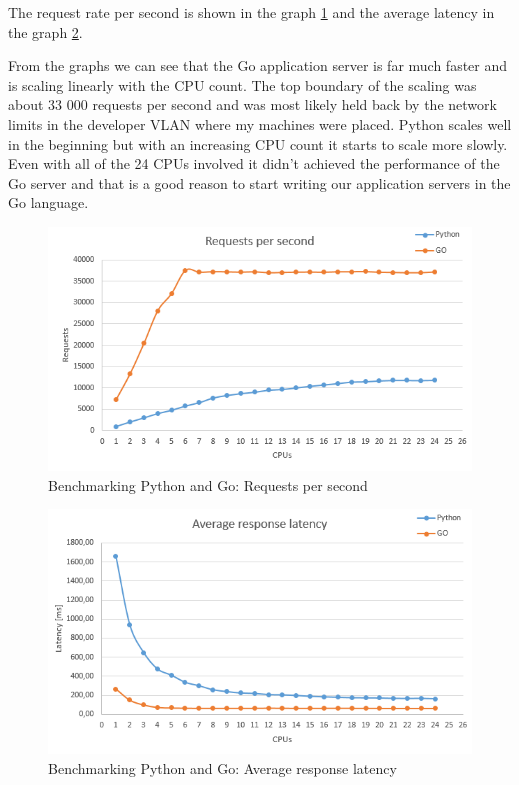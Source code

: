 The request rate per second is shown in the graph \ref{fig:benchmark-requests} and the average latency in the graph \ref{fig:benchmark-latency}.

From the graphs we can see that the Go application server is far much faster and is scaling linearly with the CPU count. The top boundary of the scaling was about 33 000 requests per second and was most likely held back by the network limits in the developer VLAN where my machines were placed. Python scales well in the beginning but with an increasing CPU count it starts to scale more slowly. Even with all of the 24 CPUs involved it didn’t achieved the performance of the Go server and that is a good reason to start writing our application servers in the Go language.

\begin{figure}[htb]\centering
  \includegraphics[width=1\textwidth]{images/benchmark-requests.png}
  \caption
    {Benchmarking Python and Go: Requests per second}
  \label{fig:benchmark-requests}
\end{figure}
                                                  
\begin{figure}[htb]\centering
  \includegraphics[width=1\textwidth]{images/benchmark-latency.png}
  \caption
    {Benchmarking Python and Go: Average response latency}
  \label{fig:benchmark-latency}
\end{figure}
                                                  
